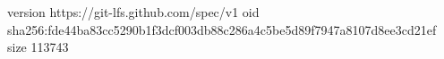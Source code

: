 version https://git-lfs.github.com/spec/v1
oid sha256:fde44ba83cc5290b1f3dcf003db88c286a4c5be5d89f7947a8107d8ee3cd21ef
size 113743
